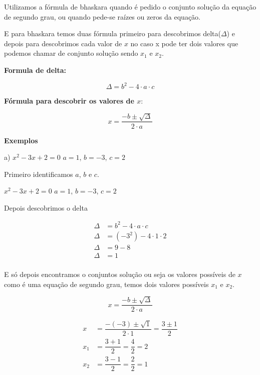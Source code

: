 \documentclass[letterpaper]{book}
\begin{document}
Utilizamos a fórmula de bhaskara quando é pedido o conjunto solução da equação de segundo grau, ou quando pede-se raízes ou zeros da equação.

E para bhaskara temos duas fórmula primeiro para descobrimos delta(\(\Delta\)) e depois para descobrimos cada valor de $x$ no caso x pode ter dois valores que podemos chamar de conjunto solução sendo {$x_1$ e $x_2$}.


\begin{center}
\textbf{Formula de delta:}
\end{center}
\[\Delta = b^{2} - 4 \cdot a \cdot c\]

\begin{center}
\textbf{Fórmula para descobrir os valores de \(x\)}:
\end{center}

\[x = \dfrac{-b \pm \sqrt{\Delta}}{2 \cdot a}\]

\begin{center}
\textbf{Exemplos}
\end{center}

 a) \(x^{2} - 3x + 2 = 0\)
\(a = 1\), \(b = -3\), \(c = 2\)

\vspace{0.5em}

Primeiro identificamos \(a\), \(b\) e \(c\).

\(x^{2} - 3x + 2 = 0\)
\(a = 1\), $b = -3$, $c = 2$

\vspace{0.5em}

Depois descobrimos o delta

\begin{align}
\Delta &= b^{2} - 4 \cdot a \cdot c\\
\Delta &= (-3^{2}) - 4 \cdot 1 \cdot 2\\
\Delta &= 9 - 8\\
\Delta &= 1\\
\end{align}

E só depois encontramos o conjuntos solução ou seja os valores possíveis de \(x\) como é uma equação de segundo grau, temos dois valores possíveis $x_1$ e $x_2$.

\[x = \dfrac{-b \pm \sqrt{\Delta}}{2 \cdot a}\]

\begin{align}
x &= \dfrac{-(-3) \pm \sqrt{1}}{2 \cdot 1} = \dfrac{3 \pm 1}{2} \\
x_1 &= \dfrac{3 + 1}{2} = \dfrac{4}{2} = 2 \\
x_2 &= \dfrac{3 - 1}{2} = \dfrac{2}{2} = 1 \\
\end{align}
\end{document}
